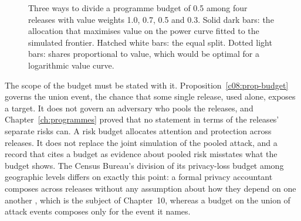 \begin{figure}[ht]
\centering
{}
\caption{Three ways to divide a programme budget of 0.5 among four releases with
value weights 1.0, 0.7, 0.5 and 0.3. Solid dark bars: the allocation that maximises
value on the power curve fitted to the simulated frontier. Hatched white bars: the
equal split. Dotted light bars: shares proportional to value, which would be optimal
for a logarithmic value curve.}
\label{c08:fig-budget}
\end{figure}

The scope of the budget must be stated with it. Proposition~\ref{c08:prop-budget}
governs the union event, the chance that some single release, used alone, exposes
a target. It does not govern an adversary who pools the releases, and
Chapter~\ref{ch:programmes} proved that no statement in terms of the releases'
separate risks can. A risk budget allocates attention and protection across
releases. It does not replace the joint simulation of the pooled attack, and a
record that cites a budget as evidence about pooled risk misstates what the budget
shows. The Census Bureau's division of its privacy-loss budget among geographic
levels differs on exactly this point: a formal privacy accountant composes across
releases without any assumption about how they depend on one another
\citep{dwork2014}, which is the subject of Chapter~10, whereas a budget on the
union of attack events composes only for the event it names.

